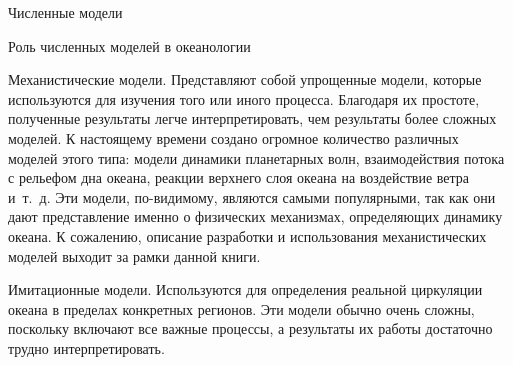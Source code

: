 \begin{chapter}{Численные модели}
\begin{section}{Роль численных моделей в океанологии}
\begin{paragraph}{Механистические модели.}
%
Представляют собой упрощенные модели, которые используются для изучения того
или иного процесса. Благодаря их простоте, полученные результаты
легче интерпретировать, чем результаты более сложных моделей. К
настоящему времени создано огромное количество различных моделей этого
типа: модели динамики планетарных волн, взаимодействия потока с рельефом дна 
океана, реакции верхнего слоя океана
на воздействие ветра и~т.~д. Эти модели, по-видимому, являются самыми
популярными, так как они дают представление именно о
физических механизмах, определяющих динамику океана. К сожалению,
описание разработки и использования механистических моделей выходит за
рамки данной книги.
% 
\end{paragraph}

\begin{paragraph}{Имитационные модели.}
%
Используются для определения реальной циркуляции
океана в пределах конкретных регионов. Эти модели обычно очень сложны,
поскольку включают все важные процессы, а результаты их работы достаточно 
трудно интерпретировать.
%


\end{paragraph}
\end{section}
\end{chapter}

